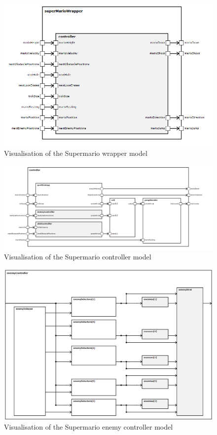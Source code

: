 
\begin{figure}
	\centering
	\includegraphics[scale=0.3]{pictures/haller_supermariowrapper.PNG}
	\caption{Visualisation of the Supermario wrapper model}
	\label{fig:marioWrapper}
\end{figure}

\begin{figure}
	\centering
	\includegraphics[scale=0.3]{pictures/haller_controller.PNG}
	\caption{Visualisation of the Supermario controller model}
	\label{fig:marioController}
\end{figure}

\begin{figure}
	\centering
	\includegraphics[scale=0.3]{pictures/haller_enemycontroller.PNG}
	\caption{Visualisation of the Supermario enemy controller model}
	\label{fig:marioEnemyController}
\end{figure}

